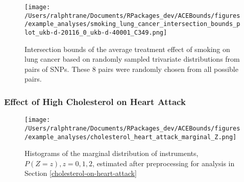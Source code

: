 \documentclass[
]{article}
\theoremstyle{plain}
\begin{document}
\begin{figure}[H]
  \center
  \texttt{[image: /Users/ralphtrane/Documents/RPackages\_dev/ACEBounds/figures/example\_analyses/smoking\_lung\_cancer\_intersection\_bounds\_plot\_ukb-d-20116\_0\_ukb-d-40001\_C349.png]}
  \caption{Intersection bounds of the average treatment effect of smoking on lung cancer based on randomly sampled trivariate distributions from pairs of SNPs. These 8 pairs were randomly chosen from all possible pairs.}
  \label{fig:smoking_on_lung_cancer_intersections}
\end{figure}

\hypertarget{effect-of-high-cholesterol-on-heart-attack}{%
\subsubsection{\texorpdfstring{Effect of High Cholesterol on Heart Attack \label{appendix:cholesterol-on-heart-attack}}{Effect of High Cholesterol on Heart Attack }}\label{effect-of-high-cholesterol-on-heart-attack}}

\begin{figure}[H]
  \center
  \texttt{[image: /Users/ralphtrane/Documents/RPackages\_dev/ACEBounds/figures/example\_analyses/cholesterol\_heart\_attack\_marginal\_Z.png]}
  \caption{Histograms of the marginal distribution of instruments, $P(Z = z), z=0,1,2$, estimated after preprocessing for analysis in Section \ref{cholesterol-on-heart-attack}}
  \label{fig:marginal-distribution-of-instruments-cholesterol-heart-attack}
\end{figure}
\end{document}
